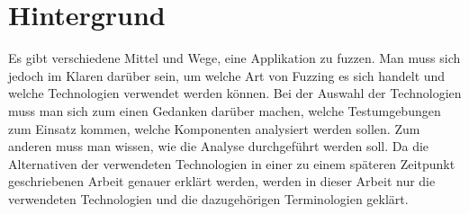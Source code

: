 
\section{Hintergrund}\label{sec:Hintergrund}
Es gibt verschiedene Mittel und Wege, eine Applikation zu fuzzen.
Man muss sich jedoch im Klaren darüber sein, um welche Art von Fuzzing es sich handelt und welche Technologien verwendet werden können.
Bei der Auswahl der Technologien muss man sich zum einen Gedanken darüber machen, welche Testumgebungen zum Einsatz kommen, welche Komponenten analysiert werden sollen.
Zum anderen muss man wissen, wie die Analyse durchgeführt werden soll.
Da die Alternativen der verwendeten Technologien in einer zu einem späteren Zeitpunkt geschriebenen Arbeit genauer erklärt werden,
werden in dieser Arbeit nur die verwendeten Technologien und die dazugehörigen Terminologien geklärt.


